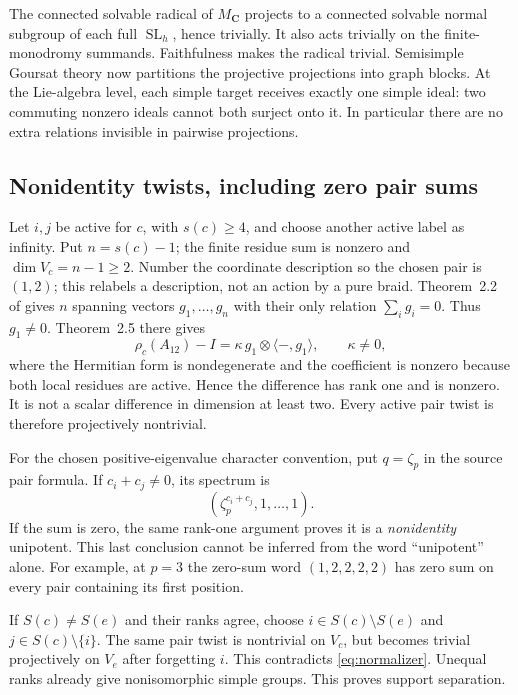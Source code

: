 \documentclass[11pt]{article}
\theoremstyle{definition}
\newcommand{\C}{\mathbf C}
\newcommand{\SL}{\operatorname{SL}}
\begin{document}
The connected solvable radical of $M_\C$ projects to a connected solvable
normal subgroup of each full $\SL_h$, hence trivially. It also acts
trivially on the finite-monodromy summands. Faithfulness makes the radical
trivial. Semisimple Goursat theory now partitions the projective projections
into graph blocks. At the Lie-algebra level, each simple target receives
exactly one simple ideal: two commuting nonzero ideals cannot both surject
onto it. In particular there are no extra relations invisible in pairwise
projections.

\subsection{Nonidentity twists, including zero pair sums}
Let $i,j$ be active for $c$, with $s(c)\geq4$, and choose another active
label as infinity. Put $n=s(c)-1$; the finite residue sum is nonzero and
$\dim V_c=n-1\geq2$. Number the coordinate description so the chosen
pair is $(1,2)$; this relabels a description, not an action by a pure braid.
Theorem~2.2 of \cite{MN} gives $n$ spanning vectors $g_1,\ldots,g_n$
with their only relation $\sum_i g_i=0$. Thus $g_1\ne0$. Theorem~2.5
there gives
\[
 \rho_c(A_{12})-I=\kappa\,g_1\otimes\langle -,g_1\rangle,
 \qquad \kappa\ne0,
\]
where the Hermitian form is nondegenerate and the coefficient is nonzero
because both local residues are active. Hence the difference has rank one
and is nonzero. It is not a scalar difference in dimension at least two.
Every active pair twist is therefore projectively nontrivial.

For the chosen positive-eigenvalue character convention, put $q=\zeta_p$
in the source pair formula. If $c_i+c_j\ne0$, its spectrum is
\begin{equation}\label{eq:reflection}
 (\zeta_p^{c_i+c_j},1,\ldots,1).
\end{equation}
If the sum is zero, the same rank-one argument proves it is a
\emph{nonidentity} unipotent. This last conclusion cannot be inferred from
the word ``unipotent'' alone. For example, at $p=3$ the zero-sum word
$(1,2,2,2,2)$ has zero sum on every pair containing its first position.

If $S(c)\ne S(e)$ and their ranks agree, choose $i\in S(c)\setminus S(e)$
and $j\in S(c)\setminus\{i\}$. The same pair twist is nontrivial on
$V_c$, but becomes trivial projectively on $V_e$ after forgetting $i$.
This contradicts \eqref{eq:normalizer}. Unequal ranks already give
nonisomorphic simple groups. This proves support separation.
\end{document}

